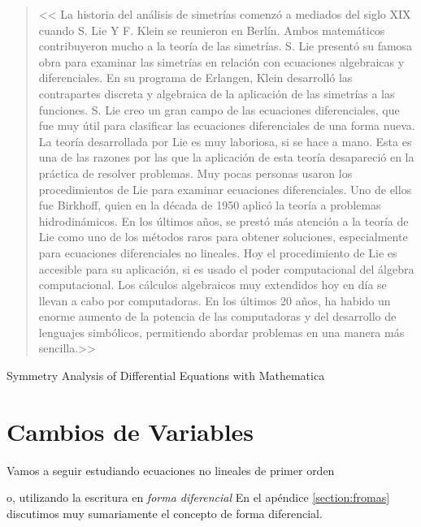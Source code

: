  
\begin{quote}
<< La historia del análisis de simetrías comenzó a mediados del siglo XIX cuando S. Lie
Y F. Klein se reunieron en Berlín. Ambos matemáticos contribuyeron mucho a la teoría de las
simetrías. S. Lie presentó su famosa obra para examinar las simetrías en relación con
ecuaciones algebraicas y diferenciales. En su programa de Erlangen, Klein desarrolló las contrapartes discreta y algebraica de la aplicación de las simetrías a las funciones. S. Lie
creo un gran campo de las ecuaciones diferenciales, que fue muy útil para
clasificar las ecuaciones diferenciales de una forma nueva. La teoría desarrollada por Lie es
muy laboriosa, si se hace a mano. Esta es una de las razones por las que la aplicación de
esta teoría desapareció en la práctica de resolver problemas. Muy pocas personas usaron los procedimientos de  Lie para examinar ecuaciones diferenciales. Uno de ellos fue Birkhoff,
quien en la década de 1950 aplicó la teoría a problemas hidrodinámicos. En los últimos años,
 se prestó más atención a la teoría de Lie como uno de los métodos raros para obtener
soluciones, especialmente para ecuaciones diferenciales no lineales. Hoy el procedimiento de Lie es
accesible para su aplicación, si es usado el poder computacional del álgebra computacional. 
Los cálculos algebraicos muy extendidos hoy en día se llevan a cabo por computadoras. 
En los últimos 20 años, ha habido un enorme aumento de la potencia de  las computadoras y del desarrollo de lenguajes simbólicos, permitiendo abordar problemas en una
manera más sencilla.>>
\end{quote}
  

\begin{flushright}

Symmetry Analysis of
Differential Equations
with Mathematica\textregistered\\
\cite{GerdBaumann578}

\end{flushright}




\section{Cambios de Variables}



Vamos a seguir estudiando ecuaciones no lineales de primer orden

o, utilizando  la escritura en  \emph{forma diferencial}
En el apéndice \ref{section:fromas} discutimos muy sumariamente el concepto de forma diferencial.

